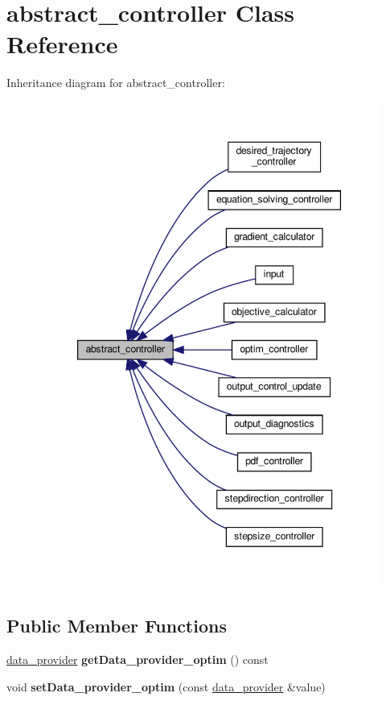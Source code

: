 \hypertarget{classabstract__controller}{}\section{abstract\+\_\+controller Class Reference}
\label{classabstract__controller}


Inheritance diagram for abstract\+\_\+controller\+:\nopagebreak
\begin{figure}[H]
\begin{center}
\leavevmode
\includegraphics[width=347pt]{classabstract__controller__inherit__graph}
\end{center}
\end{figure}
\subsection*{Public Member Functions}
\begin{DoxyCompactItemize}
\item 
\mbox{\label{classabstract__controller_ae4a15450620978e51c578666d359349c}} 
\hyperlink{classdata__provider}{data\+\_\+provider} {\bfseries get\+Data\+\_\+provider\+\_\+optim} () const
\item 
\mbox{\label{classabstract__controller_a35988272a58784db06c9d1e48f0a3292}} 
void {\bfseries set\+Data\+\_\+provider\+\_\+optim} (const \hyperlink{classdata__provider}{data\+\_\+provider} \&value)
\end{DoxyCompactItemize}


